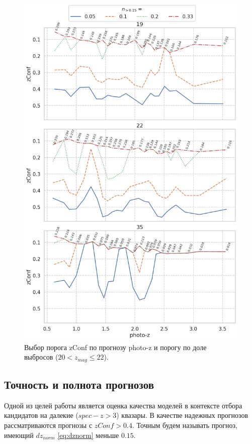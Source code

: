 \documentclass[fleqn,usenatbib]{mnras}
\begin{document}
\begin{figure}
    \centering
    \includegraphics[width=0.9\linewidth]{images/zconf-by-photo_z-x-n015_zgr20.png}
    \caption{Выбор порога zConf по прогнозу photo-z и порогу по доле выбросов ($20 < z_{mag} \leq 22$).}
    \label{fig:my_label}
\end{figure}

\clearpage

\subsection{Точность и полнота прогнозов}\label{ssec:precision-and-completeness}

Одной из целей работы является оценка качества моделей в контексте отбора кандидатов на далекие ($spec-z > 3$) квазары. В качестве надежных прогнозов рассматриваются прогнозы с $zConf > 0.4$. Точным будем называть прогноз, имеющий $dz_{norm}$ \eqref{eq:dznorm} меньше $0.15$.
\end{document}
